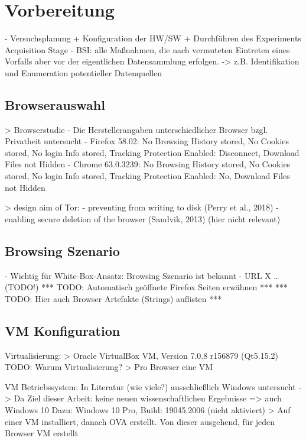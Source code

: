 \section{Vorbereitung}

- \cite{Izzati.2022} Versuchsplanung + Konfiguration der HW/SW + Durchführen des Experiments Acquisition Stage
- BSI: alle Maßnahmen, die nach vermuteten Eintreten eines Vorfalls aber vor der eigentlichen Datensammlung erfolgen. 
	-> z.B. Identifikation und Enumeration potentieller Datenquellen

\subsection{Browserauswahl}

> Browserstudie \cite{Izzati.2022}
- Die Herstellerangaben unterschiedlicher Browser bzgl. Privatheit untersucht
- Firefox 58.02: No Browsing History stored, No Cookies stored, No login Info stored, Tracking Protection Enabled: Disconnect, Download Files not Hidden
- Chrome 63.0.3239: No Browsing History stored, No Cookies stored, No login Info stored, Tracking Protection Enabled: No, Download Files not Hidden

> design aim of Tor: \cite{Muir.2019}
- preventing from writing to disk (Perry et al., 2018) 
- enabling secure deletion of the browser (Sandvik, 2013) (hier nicht relevant)

\subsection{Browsing Szenario}
- Wichtig für White-Box-Ansatz: Browsing Szenario ist bekannt
- URL X … 	(TODO!)
*** TODO: Automatisch geöffnete Firefox Seiten erwähnen ***
*** TODO: Hier auch Browser Artefakte (Strings) auflisten ***

\subsection*{VM Konfiguration}

Virtualisierung:
	> Oracle VirtualBox VM, Version 7.0.8 r156879 (Qt5.15.2)
	TODO: Warum Virtualisierung?
	> Pro Browser eine VM

VM Betriebssystem: In Literatur (wie viele?) ausschließlich Windows untersucht -> Da Ziel dieser Arbeit: keine neuen wissenschaftlichen Ergebnisse => auch Windows 10
	Dazu: Windows 10 Pro, Build: 19045.2006 (nicht aktiviert)
	> Auf einer VM installiert, danach OVA erstellt. Von dieser ausgehend, für jeden Browser VM erstellt

